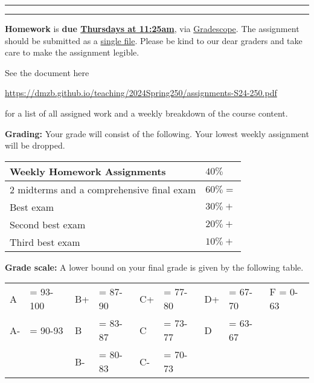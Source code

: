 \documentclass[12pt]{article}
\begin{document}
\smallskip \hrule \medskip

\newpage
\smallskip \hrule \medskip
\noindent \textbf{Homework} is \textbf{due \underline{Thursdays at 11:25am}}, via \underline{Gradescope}. The assignment should be submitted as a \underline{single file}. Please be kind to our dear graders and take care to make the assignment legible.
\smallskip

\noindent See the document here
\begin{center}
 \url{https://dmzb.github.io/teaching/2024Spring250/assignments-S24-250.pdf}
\end{center}
for a list of all assigned work and a weekly breakdown of the course content.
\medskip

\noindent\textbf{Grading:}
Your grade will consist of the following. Your lowest weekly assignment will be dropped.

\begin{center}
 \begin{tabular}{|l|l|}
 \hline
 Weekly Homework Assignments & $40\%$ \\
 \hline
 2 midterms and a comprehensive final exam & $60\% = $ 	 \\
 Best exam & $30\% + $ 	 \\
 Second best exam& $20\% + $ 	 \\
 Third best exam & $10\% + $ 	 \\
 \hline
 \end{tabular}
\end{center}

\vspace*{.15in}
\noindent\textbf{Grade scale:}
A lower bound on your final grade is given by the following table.

\begin{center}
 \begin{tabular}{|ll|ll|ll|ll|l|}
\hline
A &\hspace{-3 pt}\hspace{-7 pt}= 93-100 &B+ &\hspace{-7 pt}= 87-90 &C+ &\hspace{-7 pt}= 77-80 & D+ &\hspace{-7 pt}= 67-70 & F = 0-63\\
A- &\hspace{-3 pt}\hspace{-7 pt}= 90-93 &B &\hspace{-7 pt}= 83-87 & C &\hspace{-7 pt}= 73-77 & D &\hspace{-7 pt}= 63-67 &\\
 & &B- &\hspace{-7 pt}= 80-83 &C- &\hspace{-7 pt}= 70-73 & & &\\
 \hline
 \end{tabular}
\end{center}
\end{document}
